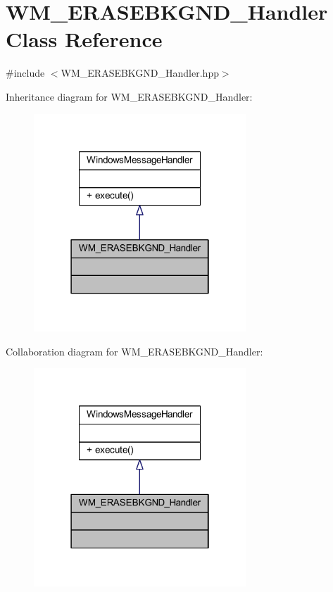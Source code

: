 \hypertarget{class_w_m___e_r_a_s_e_b_k_g_n_d___handler}{}\section{W\+M\+\_\+\+E\+R\+A\+S\+E\+B\+K\+G\+N\+D\+\_\+\+Handler Class Reference}
\label{class_w_m___e_r_a_s_e_b_k_g_n_d___handler}


{\ttfamily \#include $<$W\+M\+\_\+\+E\+R\+A\+S\+E\+B\+K\+G\+N\+D\+\_\+\+Handler.\+hpp$>$}



Inheritance diagram for W\+M\+\_\+\+E\+R\+A\+S\+E\+B\+K\+G\+N\+D\+\_\+\+Handler\+:\nopagebreak
\begin{figure}[H]
\begin{center}
\leavevmode
\includegraphics[width=226pt]{class_w_m___e_r_a_s_e_b_k_g_n_d___handler__inherit__graph}
\end{center}
\end{figure}


Collaboration diagram for W\+M\+\_\+\+E\+R\+A\+S\+E\+B\+K\+G\+N\+D\+\_\+\+Handler\+:\nopagebreak
\begin{figure}[H]
\begin{center}
\leavevmode
\includegraphics[width=226pt]{class_w_m___e_r_a_s_e_b_k_g_n_d___handler__coll__graph}
\end{center}
\end{figure}
